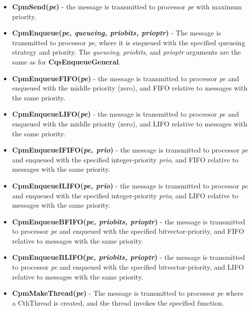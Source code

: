 \begin{itemize}

\item[]{{\bf CpmSend({\it pe})} - the message is transmitted to
processor {\it pe} with maximum priority}.

\item[]{{\bf CpmEnqueue({\it pe, queueing, priobits, prioptr})}
- The message is transmitted to processor {\it pe}, where it is
enqueued with the specified queueing strategy and priority.  The {\it
queueing}, {\it priobits}, and {\it prioptr} arguments are the same as
for {\bf CqsEnqueueGeneral}.}

\item[]{{\bf CpmEnqueueFIFO({\it pe})} - the message is transmitted to
processor {\it pe} and enqueued with the middle priority (zero), and
FIFO relative to messages with the same priority.}

\item[]{{\bf CpmEnqueueLIFO({\it pe})} - the message is transmitted to
processor {\it pe} and enqueued with the middle priority (zero), and
LIFO relative to messages with the same priority.}

\item[]{{\bf CpmEnqueueIFIFO({\it pe, prio})} - the message is
transmitted to processor {\it pe} and enqueued with the specified
integer-priority {\it prio}, and FIFO relative to messages with the
same priority.}

\item[]{{\bf CpmEnqueueILIFO({\it pe, prio})} - the message is
transmitted to processor {\it pe} and enqueued with the specified
integer-priority {\it prio}, and LIFO relative to messages with the
same priority.}

\item[]{{\bf CpmEnqueueBFIFO({\it pe, priobits, prioptr})} - the
message is transmitted to processor {\it pe} and enqueued with the
specified bitvector-priority, and FIFO relative to messages
with the same priority.}

\item[]{{\bf CpmEnqueueBLIFO({\it pe, priobits, prioptr})} - the
message is transmitted to processor {\it pe} and enqueued with the
specified bitvector-priority, and LIFO relative to messages with the
same priority.}

\item[]{{\bf CpmMakeThread({\it pe})} - The message is transmitted to
processor {\it pe} where a CthThread is created, and the thread
invokes the specified function.}

\end{itemize}


